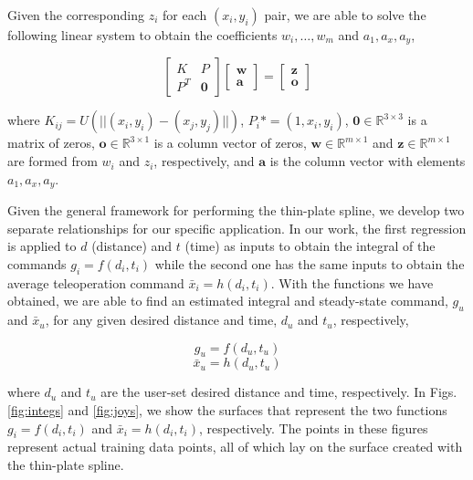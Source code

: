 \documentclass[letterpaper, 10 pt, conference]{ieeeconf}  %
\newcommand\NB[1]{$\spadesuit$\footnote{NB: #1}}
\begin{document}
Given the corresponding $z_i$ for each $(x_i,y_i)$ pair, we are able to solve the following linear system to obtain the coefficients $w_i,\ldots,w_m$ and $a_1,a_x,a_y$,

\begin{equation}
    \begin{bmatrix}
    K&P\\
    P^T& \mathbf{0}
    \end{bmatrix}
    \begin{bmatrix}
    \mathbf{w}\\
    \mathbf{a}
    \end{bmatrix} = 
    \begin{bmatrix}
    \mathbf{z}\\
    \mathbf{o}
    \end{bmatrix}
\end{equation}

where $K_{ij} = U(||(x_i,y_i)-(x_j,y_j)||)$, $P_i* = (1,x_i,y_i)$, $\mathbf{0}  \in \mathbb{R}^{3\times3}$ is a matrix of zeros, $\mathbf{o} \in \mathbb{R}^{3\times1}$ is a column vector of zeros, $\mathbf{w} \in \mathbb{R}^{m\times1}$ and $\mathbf{z} \in \mathbb{R}^{m\times1}$ are formed from $w_i$ and $z_i$, respectively, and $\mathbf{a}$ is the column vector with elements $a_1,a_x,a_y$.

Given the general framework for performing the thin-plate spline, we develop two separate relationships for our specific application. In our work, the first regression is applied to $d$ (distance) and $t$ (time) as inputs to obtain the integral of the commands $g_i = f(d_i,t_i)$ while the second one has the same inputs to obtain the average teleoperation command $\bar{x}_i = h(d_i,t_i)$. With the functions we have obtained, we are able to find an estimated integral and steady-state command, $g_u$ and $\bar{x}_u$, for any given desired distance and time, $d_u$ and $t_u$, respectively,

\begin{equation} \label{eq:integralfit}
g_u = f(d_u,t_u)
\end{equation}
\begin{equation} \label{eq:ssvelfit}
\bar{x}_u = h(d_u,t_u)
\end{equation}

where $d_u$ and $t_u$ are the user-set desired distance and time, respectively. In Figs.\ref{fig:integs} and \ref{fig:joys}, we show the surfaces that represent the two functions $g_i = f(d_i,t_i)$ and $\bar{x}_i = h(d_i,t_i)$, respectively. The points in these figures represent actual training data points, all of which lay on the surface created with the thin-plate spline.
\end{document}
